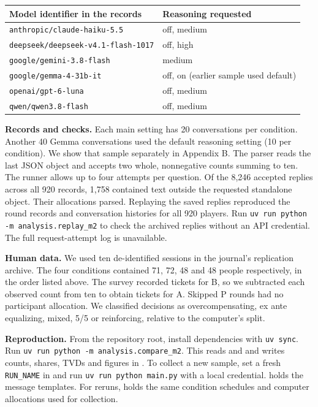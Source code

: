 \documentclass[11pt,letterpaper]{article}
\newcommand{\head}[1]{\par\vspace{2pt}\noindent\textbf{#1}\hspace{.3em}}
\begin{document}
{\centering\small\setlength{\tabcolsep}{8pt}\renewcommand{\arraystretch}{1.08}
\begin{tabular}{@{}ll@{}}\toprule
Model identifier in the records & Reasoning requested\\\midrule
\texttt{anthropic/claude-haiku-5.5} & off, medium\\
\texttt{deepseek/deepseek-v4.1-flash-1017} & off, high\\
\texttt{google/gemini-3.8-flash} & medium\\
\texttt{google/gemma-4-31b-it} & off, on (earlier sample used default)\\
\texttt{openai/gpt-6-luna} & off, medium\\
\texttt{qwen/qwen3.8-flash} & off, medium\\\bottomrule
\end{tabular}\par}

\head{Records and checks.} Each main setting has 20 conversations per condition. Another 40 Gemma conversations used the default reasoning setting (10 per condition). We show that sample separately in Appendix B. The parser reads the last JSON object and accepts two whole, nonnegative counts summing to ten. The runner allows up to four attempts per question. Of the 8,246 accepted replies across all 920 records, 1,758 contained text outside the requested standalone object. Their allocations parsed. Replaying the saved replies reproduced the round records and conversation histories for all 920 players. Run \texttt{uv run python -m analysis.replay\_m2} to check the archived replies without an API credential. The full request-attempt log is unavailable.

\head{Human data.} We used ten de-identified sessions in the journal's replication archive. The four conditions contained 71, 72, 48 and 48 people respectively, in the order listed above. The survey recorded tickets for B, so we subtracted each observed count from ten to obtain tickets for A. Skipped P rounds had no participant allocation. We classified decisions as overcompensating, ex ante equalizing, mixed, 5/5 or reinforcing, relative to the computer's split.

\head{Reproduction.} From the repository root, install dependencies with \texttt{uv sync}. Run \texttt{uv run python -m analysis.compare\_m2}. This reads  and  and writes counts, shares, TVDs and figures in . To collect a new sample, set a fresh \texttt{RUN\_NAME} in  and run \texttt{uv run python main.py} with a local credential.  holds the message templates. For reruns,  holds the same condition schedules and computer allocations used for collection.
\end{document}
